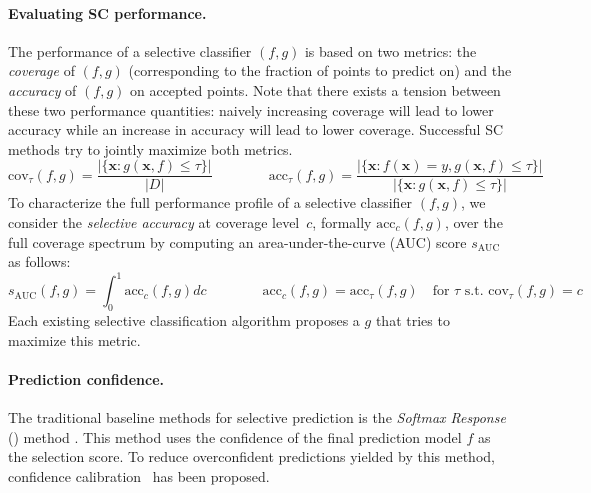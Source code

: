 \paragraph{Evaluating SC performance.} The performance of a selective classifier $(f,g)$ is based on two metrics: the \emph{coverage} of $(f,g)$ (corresponding to the fraction of points to predict on) and the \emph{accuracy} of $(f,g)$ on accepted points. Note that there exists a tension between these two performance quantities: naively increasing coverage will lead to lower accuracy while an increase in accuracy will lead to lower coverage. Successful SC methods try to jointly maximize both metrics.%
    \begin{equation}
    \text{cov}_\tau(f,g) = \frac{|\{\bm{x} : g(\bm{x}, f) \leq \tau \}|}{|D|} \qquad \qquad 
    \text{acc}_\tau(f,g) = \frac{|\{\bm{x} : f(\bm{x}) = y, g(\bm{x}, f) \leq \tau \}|}{|\{\bm{x} : g(\bm{x}, f) \leq \tau \}|}
    \end{equation}
To characterize the full performance profile of a selective classifier $(f,g)$, we consider the \emph{selective accuracy} at coverage level~$c$, formally $\text{acc}_c(f,g)$, over the full coverage spectrum by computing an area-under-the-curve (AUC) score $s_\text{AUC}$ as follows:%
\begin{equation}
\label{eq:sc_perf}
    s_\text{AUC}(f,g) = \int_0^1 \text{acc}_c(f,g)dc \qquad \qquad  \text{acc}_c(f,g) = \text{acc}_\tau(f,g)\quad \text{for $\tau$ s.t. $\text{cov}_\tau(f,g) = c$} 
\end{equation}
Each existing selective classification algorithm proposes a $g$ that tries to maximize this metric. %


\paragraph{Prediction confidence.} The traditional baseline methods for selective prediction is the \emph{Softmax Response} (\sr) method \citep{hendrycks2016baseline, geifman2017selective}. This method uses the confidence of the final prediction model $f$ as the selection score. To reduce overconfident predictions yielded by this method, confidence calibration~\citep{guo2017calibration} has been proposed.

